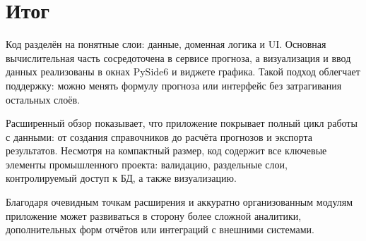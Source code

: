 \documentclass[12pt,a4paper]{article}
\begin{document}
\section*{Итог}
Код разделён на понятные слои: данные, доменная логика и UI. Основная вычислительная
часть сосредоточена в сервисе прогноза, а визуализация и ввод данных реализованы
в окнах PySide6 и виджете графика.
Такой подход облегчает поддержку: можно менять формулу прогноза или интерфейс
без затрагивания остальных слоёв.

Расширенный обзор показывает, что приложение покрывает полный цикл работы с данными:
от создания справочников до расчёта прогнозов и экспорта результатов. Несмотря на
компактный размер, код содержит все ключевые элементы промышленного проекта:
валидацию, раздельные слои, контролируемый доступ к БД, а также визуализацию.

Благодаря очевидным точкам расширения и аккуратно организованным модулям
приложение может развиваться в сторону более сложной аналитики, дополнительных
форм отчётов или интеграций с внешними системами.
\end{document}
